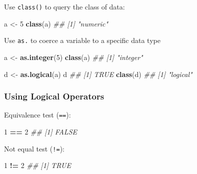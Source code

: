 \documentclass[
]{book}
\newenvironment{Shaded}{\begin{snugshade}}{\end{snugshade}}
\newcommand{\CommentTok}[1]{\textcolor[rgb]{0.56,0.35,0.01}{\textit{#1}}}
\newcommand{\DecValTok}[1]{\textcolor[rgb]{0.00,0.00,0.81}{#1}}
\newcommand{\KeywordTok}[1]{\textcolor[rgb]{0.13,0.29,0.53}{\textbf{#1}}}
\newcommand{\NormalTok}[1]{#1}
\newcommand{\OperatorTok}[1]{\textcolor[rgb]{0.81,0.36,0.00}{\textbf{#1}}}
\newcommand{\StringTok}[1]{\textcolor[rgb]{0.31,0.60,0.02}{#1}}
\begin{document}
Use \texttt{class()} to query the class of data:

\begin{Shaded}
\begin{Highlighting}[]
\NormalTok{a <-}\StringTok{ }\DecValTok{5}
\KeywordTok{class}\NormalTok{(a)}
\CommentTok{## [1] "numeric"}
\end{Highlighting}
\end{Shaded}

Use \texttt{as.} to coerce a variable to a specific data type

\begin{Shaded}
\begin{Highlighting}[]
\NormalTok{a <-}\StringTok{ }\KeywordTok{as.integer}\NormalTok{(}\DecValTok{5}\NormalTok{)}
\KeywordTok{class}\NormalTok{(a)}
\CommentTok{## [1] "integer"}
\end{Highlighting}
\end{Shaded}

\begin{Shaded}
\begin{Highlighting}[]
\NormalTok{d <-}\StringTok{ }\KeywordTok{as.logical}\NormalTok{(a)}
\NormalTok{d}
\CommentTok{## [1] TRUE}
\KeywordTok{class}\NormalTok{(d)}
\CommentTok{## [1] "logical"}
\end{Highlighting}
\end{Shaded}

\hypertarget{using-logical-operators}{%
\subsubsection*{Using Logical Operators}\label{using-logical-operators}}

Equivalence test (\texttt{==}):

\begin{Shaded}
\begin{Highlighting}[]
\DecValTok{1} \OperatorTok{==}\StringTok{ }\DecValTok{2}
\CommentTok{## [1] FALSE}
\end{Highlighting}
\end{Shaded}

Not equal test (\texttt{!=}):

\begin{Shaded}
\begin{Highlighting}[]
\DecValTok{1} \OperatorTok{!=}\StringTok{ }\DecValTok{2}
\CommentTok{## [1] TRUE}
\end{Highlighting}
\end{Shaded}
\end{document}
